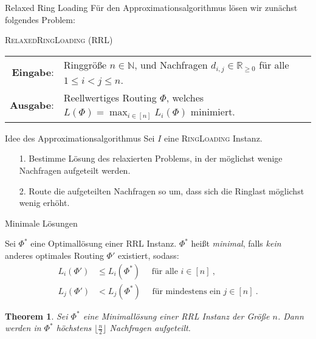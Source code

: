 \documentclass[8pt]{beamer}
\newcommand{\R}{\mathbb{R}}
\newcommand{\N}{\mathbb{N}}
\newcommand{\RL}{\textsc{RingLoading}\xspace}
\newcommand{\RRL}{\textsc{RRL}\xspace}
\theoremstyle{claim}
\newtheorem{mytheorem}[theorem]{Theorem}
\begin{document}
	\begin{frame}{Relaxed Ring Loading}
		Für den Approximationsalgorithmus lösen wir zunächst folgendes Problem:
		\vspace{5mm}
		\begin{center}
			\begin{mdframed}
				\centering
				\textsc{RelaxedRingLoading} (\textsc{RRL})\\[0.7em]
				\begin{tabular}{rl}
					{\bfseries Eingabe}: & Ringgröße $n \in \N$, und Nachfragen $d_{i, j} \in \R_{\geq 0}$ für alle $1 \leq i<j\leq n$.\\
					{\bfseries Ausgabe}: & Reellwertiges Routing $\Phi$, welches $L(\Phi) = \max_{i \in [n]} L_i(\Phi)$ minimiert.
				\end{tabular}
			\end{mdframed}
		\end{center}
	\end{frame}
	
	
	\begin{frame}{Idee des Approximationsalgorithmus}
		Sei $I$ eine \RL Instanz.
		\begin{enumerate}
			\item[1.] Bestimme Lösung des relaxierten Problems, in der möglichst wenige Nachfragen aufgeteilt werden.
			\item[2.] Route die aufgeteilten Nachfragen so um, dass sich die Ringlast möglichst wenig erhöht.
		\end{enumerate}
	\end{frame}

	\begin{frame}{Minimale Lösungen}
		\begin{definition}
			Sei $\Phi^\ast$ eine Optimallösung einer \RRL Instanz.
			$\Phi^\ast$ heißt \emph{minimal}, falls \emph{kein} anderes optimales Routing $\Phi'$ existiert, sodass:
			\begin{align}
				L_i(\Phi') &\leq L_i(\Phi^\ast) \quad \text{ für alle } i \in [n] \ ,\\
				L_j(\Phi') &< L_j(\Phi^\ast) \quad \text{ für mindestens ein } j \in [n] \ .
			\end{align}
		\end{definition}\pause
		\begin{mytheorem}
			Sei $\Phi^\ast$ eine Minimallösung einer \RRL Instanz der Größe $n$.
			Dann werden in $\Phi^\ast$ höchstens $\lfloor \frac{n}{2} \rfloor$ Nachfragen aufgeteilt.
		\end{mytheorem}
	\end{frame}
\end{document}
